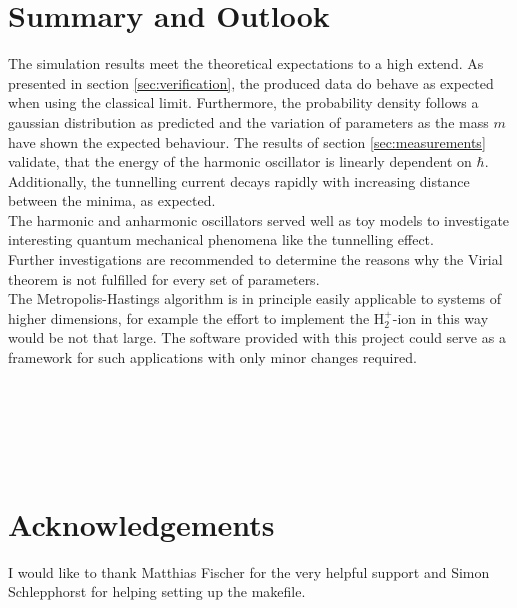 \documentclass{scrartcl}
\begin{document}
	\section{Summary and Outlook}
		The simulation results meet the theoretical expectations to a high extend.
		As presented in section \ref{sec:verification}, the produced data do behave as expected when using the classical limit.
		Furthermore, the probability density follows a gaussian distribution as predicted and the variation of parameters as the mass $m$ have shown the expected behaviour.
		The results of section \ref{sec:measurements} validate, that the energy of the harmonic oscillator is linearly dependent on $\hbar$.
		Additionally, the tunnelling current decays rapidly with increasing distance between the minima, as expected.
		\\
		The harmonic and anharmonic oscillators served well as toy models to investigate interesting quantum mechanical phenomena like the tunnelling effect.
		\\
		Further investigations are recommended to determine the reasons why the Virial theorem is not fulfilled for every set of parameters.
		\\
		The Metropolis-Hastings algorithm is in principle easily applicable to systems of higher dimensions, for example the effort to implement the H$_2^+$-ion in this way would be not that large.
		The software provided with this project could serve as a framework for such applications with only minor changes required.
		\\\\\\\\\\\\

	\section{Acknowledgements}
		I would like to thank Matthias Fischer for the very helpful support and Simon Schlepphorst for helping setting up the makefile.
\end{document}
